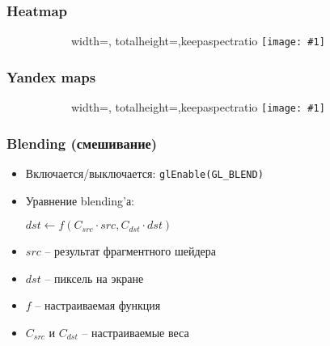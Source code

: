 \documentclass{beamer}
\newcommand{\slideimage}[1]{
  \begin{figure}
    \begin{adjustbox}{width=\textwidth, totalheight=\textheight-2\baselineskip-2\baselineskip,keepaspectratio}
      \texttt{[image: \#1]}
    \end{adjustbox}
  \end{figure}
}
\begin{document}

\begin{frame}
\frametitle{Heatmap}
\begin{figure}
\slideimage{heatmap.jpg}
\end{figure}
\end{frame}


\begin{frame}
\frametitle{Yandex maps}
\begin{figure}
\slideimage{yandex-maps.jpg}
\end{figure}
\end{frame}


\begin{frame}[fragile]
\frametitle{Blending (смешивание)}
\begin{itemize}
\item Включается/выключается: \verb|glEnable(GL_BLEND)|
\pause
\item Уравнение blending'а:
\begin{center}
\begin{math}
dst \leftarrow f(C_{src} \cdot src, C_{dst} \cdot dst)
\end{math}
\end{center}
\pause
\item \begin{math}src\end{math} -- результат фрагментного шейдера
\item \begin{math}dst\end{math} -- пиксель на экране
\item \begin{math}f\end{math} -- настраиваемая функция
\item \begin{math}C_{src}\end{math} и \begin{math}C_{dst}\end{math} -- настраиваемые веса
\end{itemize}
\end{frame}
\end{document}
